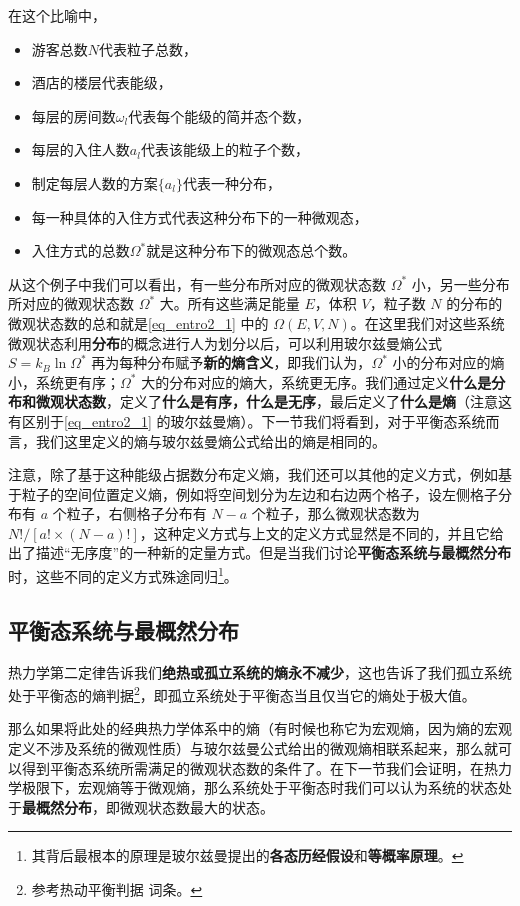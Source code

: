 \begin{example}{}
在这个比喻中，
\begin{itemize}
\item 游客总数$N$代表粒子总数，
\item 酒店的楼层代表能级，
\item 每层的房间数$\omega_l$代表每个能级的简并态个数，
\item 每层的入住人数$a_l$代表该能级上的粒子个数，
\item 制定每层人数的方案$\{a_l\}$代表一种分布，
\item 每一种具体的入住方式代表这种分布下的一种微观态，
\item 入住方式的总数$\Omega^*$就是这种分布下的微观态总个数。
\end{itemize}
\end{example}
从这个例子中我们可以看出，有一些分布所对应的微观状态数 $\Omega^*$ 小，另一些分布所对应的微观状态数 $\Omega^*$ 大。所有这些满足能量 $E$，体积 $V$，粒子数 $N$ 的分布的微观状态数的总和就是\autoref{eq_entro2_1} 中的 $\Omega(E,V,N)$。在这里我们对这些系统微观状态利用\textbf{分布}的概念进行人为划分以后，可以利用玻尔兹曼熵公式 $S=k_B\ln \Omega^*$ 再为每种分布赋予\textbf{新的熵含义}，即我们认为，$\Omega^*$ 小的分布对应的熵小，系统更有序；$\Omega^*$ 大的分布对应的熵大，系统更无序。我们通过定义\textbf{什么是分布和微观状态数}，定义了\textbf{什么是有序，什么是无序}，最后定义了\textbf{什么是熵}（注意这有区别于\autoref{eq_entro2_1} 的玻尔兹曼熵）。下一节我们将看到，对于平衡态系统而言，我们这里定义的熵与玻尔兹曼熵公式给出的熵是相同的。

注意，除了基于这种能级占据数分布定义熵，我们还可以其他的定义方式，例如基于粒子的空间位置定义熵，例如将空间划分为左边和右边两个格子，设左侧格子分布有 $a$ 个粒子，右侧格子分布有 $N-a$ 个粒子，那么微观状态数为 $N!/[a!\times(N-a)!]$，这种定义方式与上文的定义方式显然是不同的，并且它给出了描述“无序度”的一种新的定量方式。但是当我们讨论\textbf{平衡态系统与最概然分布}时，这些不同的定义方式殊途同归\footnote{其背后最根本的原理是玻尔兹曼提出的\textbf{各态历经假设}和\textbf{等概率原理}。}。

\subsection{平衡态系统与最概然分布}
热力学第二定律告诉我们\textbf{绝热或孤立系统的熵永不减少}，这也告诉了我们孤立系统处于平衡态的熵判据\footnote{参考热动平衡判据 词条。}，即孤立系统处于平衡态当且仅当它的熵处于极大值。

那么如果将此处的经典热力学体系中的熵（有时候也称它为宏观熵，因为熵的宏观定义不涉及系统的微观性质）与玻尔兹曼公式给出的微观熵相联系起来，那么就可以得到平衡态系统所需满足的微观状态数的条件了。在下一节我们会证明，在热力学极限下，宏观熵等于微观熵，那么系统处于平衡态时我们可以认为系统的状态处于\textbf{最概然分布}，即微观状态数最大的状态。

